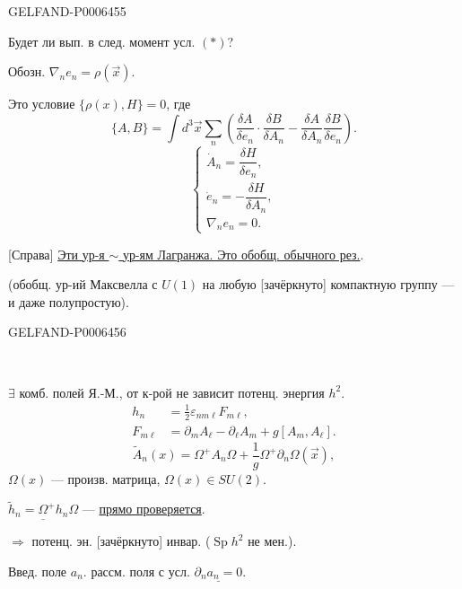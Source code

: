 \begin{GelfandAdjacentEvidence}{GELFAND-P000645}{5}


Будет ли вып. в след. момент усл. \((*)\)?

Обозн. \(\nabla_n e_n=\rho(\vec x)\).

Это условие \(\{\rho(x),H\}=0\), где
\[
\{A,B\}=\int d^3\vec x\sum_n
\left(\frac{\delta A}{\delta e_n}\cdot\frac{\delta B}{\delta A_n}
-\frac{\delta A}{\delta A_n}\frac{\delta B}{\delta e_n}\right).
\]
\[
\begin{cases}
\dot A_n=\dfrac{\delta H}{\delta e_n},\\
\dot e_n=-\dfrac{\delta H}{\delta A_n},\\
\nabla_n e_n=0.
\end{cases}
\]

[Справа] \underline{Эти ур-я \(\sim\) ур-ям Лагранжа. Это обобщ. обычного рез.}.

(обобщ. ур-ий Максвелла с \(U(1)\) на любую [зачёркнуто]
компактную группу --- и даже полупростую).
\end{GelfandAdjacentEvidence}
\begin{GelfandAdjacentEvidence}{GELFAND-P000645}{6}


\begin{center}\textemdash\,\textperiodcentered\,\textemdash\end{center}

\(\exists\) комб. полей Я.-М., от к-рой не зависит потенц. энергия \(h^2\).
\[
\begin{aligned}
h_n&=\frac12\varepsilon_{nm\ell}F_{m\ell},\\
F_{m\ell}&=\partial_m A_\ell-\partial_\ell A_m+g[A_m,A_\ell].
\end{aligned}
\]
\[
\widetilde A_n(x)=\Omega^+A_n\Omega+\frac1g\Omega^+\partial_n\Omega(\vec x),
\]
\(\Omega(x)\) --- произв. матрица, \(\Omega(x)\in SU(2)\).

\(\underline{\widetilde h_n=\Omega^+h_n\Omega}\) --- \underline{прямо проверяется}.

\(\Rightarrow\) потенц. эн. [зачёркнуто] инвар.
(\(\operatorname{Sp}h^2\) не мен.).
\end{GelfandAdjacentEvidence}


Введ. поле \(a_n\). рассм. поля с усл. \(\underline{\partial_n a_n=0}\).

